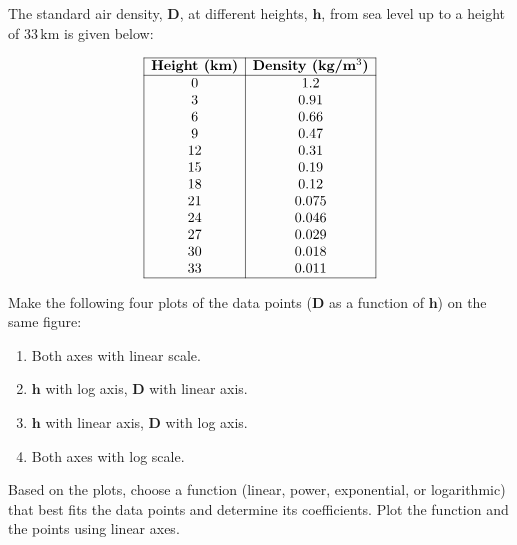 \documentclass[a4paper, 12pt]{report}
\def\ni{green!60!black!40!white}
\begin{document}
\newpage

\begin{tcolorbox}[title={\color{black}\section{Q2}}, colback=white, colframe=\ni, boxrule=1mm, width=1\textwidth]
    The standard air density, \(\mathbf{D}\), at different heights, \(\mathbf{h}\), from sea level up to a height of \(33 \, \text{km}\) is given below:
    
    \[
    \begin{array}{|c|c|}
        \hline
        \textbf{Height (km)} & \textbf{Density (kg/m\(^3\))} \\ \hline
        0 & 1.2 \\ 
        3 & 0.91 \\ 
        6 & 0.66 \\ 
        9 & 0.47 \\ 
        12 & 0.31 \\ 
        15 & 0.19 \\ 
        18 & 0.12 \\ 
        21 & 0.075 \\ 
        24 & 0.046 \\ 
        27 & 0.029 \\ 
        30 & 0.018 \\ 
        33 & 0.011 \\ \hline
    \end{array}
    \]
    
    Make the following four plots of the data points (\(\mathbf{D}\) as a function of \(\mathbf{h}\)) on the same figure:
    
    \begin{enumerate}
        \item Both axes with linear scale.
        \item \(\mathbf{h}\) with log axis, \(\mathbf{D}\) with linear axis.
        \item \(\mathbf{h}\) with linear axis, \(\mathbf{D}\) with log axis.
        \item Both axes with log scale.
    \end{enumerate}
    
    Based on the plots, choose a function (linear, power, exponential, or logarithmic) that best fits the data points and determine its coefficients. Plot the function and the points using linear axes.
\end{tcolorbox}
\end{document}
